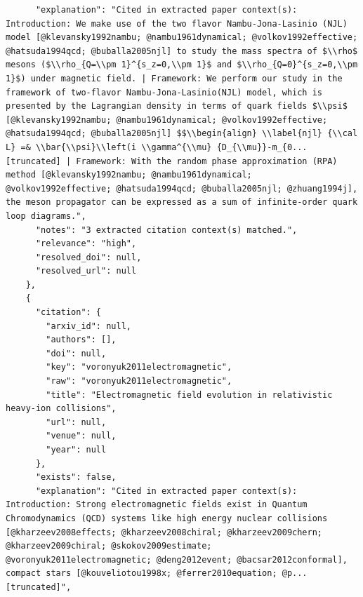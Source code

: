 \documentclass[11pt]{article}
\begin{document}
\begin{verbatim}
      "explanation": "Cited in extracted paper context(s): Introduction: We make use of the two flavor Nambu-Jona-Lasinio (NJL) model [@klevansky1992nambu; @nambu1961dynamical; @volkov1992effective; @hatsuda1994qcd; @buballa2005njl] to study the mass spectra of $\\rho$ mesons ($\\rho_{Q=\\pm 1}^{s_z=0,\\pm 1}$ and $\\rho_{Q=0}^{s_z=0,\\pm 1}$) under magnetic field. | Framework: We perform our study in the framework of two-flavor Nambu-Jona-Lasinio(NJL) model, which is presented by the Lagrangian density in terms of quark fields $\\psi$ [@klevansky1992nambu; @nambu1961dynamical; @volkov1992effective; @hatsuda1994qcd; @buballa2005njl] $$\\begin{align} \\label{njl} {\\cal L} =& \\bar{\\psi}\\left(i \\gamma^{\\mu} {D_{\\mu}}-m_{0... [truncated] | Framework: With the random phase approximation (RPA) method [@klevansky1992nambu; @nambu1961dynamical; @volkov1992effective; @hatsuda1994qcd; @buballa2005njl; @zhuang1994j], the meson propagator can be expressed as a sum of infinite-order quark loop diagrams.",
      "notes": "3 extracted citation context(s) matched.",
      "relevance": "high",
      "resolved_doi": null,
      "resolved_url": null
    },
    {
      "citation": {
        "arxiv_id": null,
        "authors": [],
        "doi": null,
        "key": "voronyuk2011electromagnetic",
        "raw": "voronyuk2011electromagnetic",
        "title": "Electromagnetic field evolution in relativistic heavy-ion collisions",
        "url": null,
        "venue": null,
        "year": null
      },
      "exists": false,
      "explanation": "Cited in extracted paper context(s): Introduction: Strong electromagnetic fields exist in Quantum Chromodynamics (QCD) systems like high energy nuclear collisions [@kharzeev2008effects; @kharzeev2008chiral; @kharzeev2009chern; @kharzeev2009chiral; @skokov2009estimate; @voronyuk2011electromagnetic; @deng2012event; @bacsar2012conformal], compact stars [@kouveliotou1998x; @ferrer2010equation; @p... [truncated]",

\end{verbatim}
\end{document}
